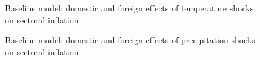 \documentclass[
  letterpaper,
  DIV=11,
  numbers=noendperiod]{scrartcl}
\begin{document}
\begin{figure}[H]


\caption{\label{fig-baseline_temp_10_90}Baseline model: domestic and
foreign effects of temperature shocks on sectoral inflation}

\end{figure}%

\begin{figure}[H]


\caption{\label{fig-baseline_precip_10_90}Baseline model: domestic and
foreign effects of precipitation shocks on sectoral inflation}

\end{figure}%
\end{document}
